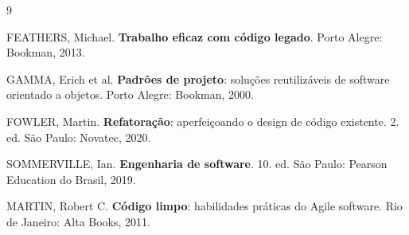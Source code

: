 \begin{thebibliography}{9}\small

 FEATHERS, Michael. \textbf{Trabalho eficaz com código legado}. Porto Alegre: Bookman, 2013.

 GAMMA, Erich et al. \textbf{Padrões de projeto}: soluções reutilizáveis de software orientado a objetos. Porto Alegre: Bookman, 2000.

 FOWLER, Martin. \textbf{Refatoração}: aperfeiçoando o design de código existente. 2. ed. São Paulo: Novatec, 2020.

 SOMMERVILLE, Ian. \textbf{Engenharia de software}. 10. ed. São Paulo: Pearson Education do Brasil, 2019.

 MARTIN, Robert C. \textbf{Código limpo}: habilidades práticas do Agile software. Rio de Janeiro: Alta Books, 2011.

\end{thebibliography}

